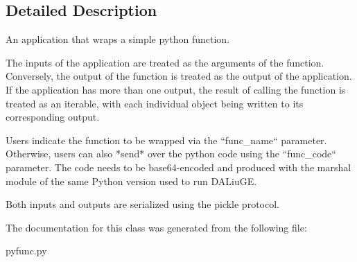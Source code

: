 \subsection{Detailed Description}
\begin{DoxyVerb}An application that wraps a simple python function.

The inputs of the application are treated as the arguments of the function.
Conversely, the output of the function is treated as the output of the
application. If the application has more than one output, the result of
calling the function is treated as an iterable, with each individual object
being written to its corresponding output.

Users indicate the function to be wrapped via the ``func_name`` parameter.
Otherwise, users can also *send* over the python code using the ``func_code``
parameter. The code needs to be base64-encoded and produced with the marshal
module of the same Python version used to run DALiuGE.

Both inputs and outputs are serialized using the pickle protocol.
\end{DoxyVerb}
 

The documentation for this class was generated from the following file\+:\begin{DoxyCompactItemize}
\item 
pyfunc.\+py\end{DoxyCompactItemize}
